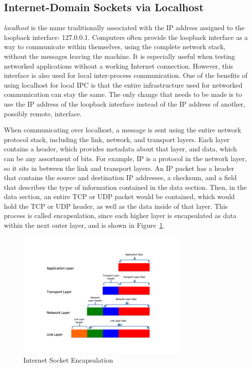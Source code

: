 \subsection{Internet-Domain Sockets via Localhost}
\label{sec:localhost}
\textit{localhost} is the name traditionally associated with the IP address assigned to the loopback interface: 127.0.0.1.  Computers often provide the loopback interface as a way to communicate within themselves, using the complete network stack, without the messages leaving the machine.  It is especially useful when testing networked applications without a working Internet connection.  However, this interface is also used for local inter-process communication.  One of the benefits of using localhost for local IPC is that the entire infrastructure used for networked communication can stay the same.  The only change that needs to be made is to use the IP address of the loopback interface instead of the IP address of another, possibly remote, interface.

When communicating over localhost, a message is sent using the entire network protocol stack, including the link, network, and transport layers.  Each layer contains a header, which provides metadata about that layer, and data, which can be any assortment of bits.  For example, IP is a protocol in the network layer, so it sits in between the link and transport layers.  An IP packet has a header that contains the source and destination IP addresses, a checksum, and a field that describes the type of information contained in the data section.  Then, in the data section, an entire TCP or UDP packet would be contained, which would hold the TCP or UDP header, as well as the data inside of that layer.  This process is called encapsulation, since each higher layer is encapsulated as data within the next outer layer, and is shown in Figure~\ref{fig:encapsulation}.

\begin{figure}
\centering
\includegraphics[width=0.75\textwidth]{encapsulation.png}
\caption{Internet Socket Encapsulation}
\label{fig:encapsulation}
\end{figure}

